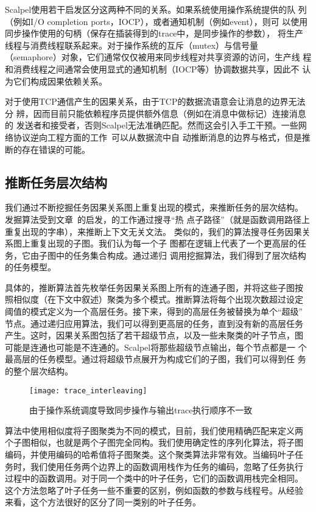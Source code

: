 Scalpel使用若干启发区分这两种不同的关系。如果系统使用操作系统提供的队
列（例如I/O completion ports，IOCP），或者通知机制（例如event），则可
以使用同步操作使用的句柄（保存在插装得到的trace中，是同步操作的参数），
将生产线程与消费线程联系起来。对于操作系统的互斥（mutex）与信号量
（semaphore）对象，它们通常仅仅被用来同步线程对共享资源的访问，生产线
程和消费线程之间通常会使用显式的通知机制（IOCP等）协调数据共享，因此不
认为它们构成因果依赖关系。

对于使用TCP通信产生的因果关系，由于TCP的数据流语意会让消息的边界无法分
辨，因而目前只能依赖程序员提供额外信息（例如在消息中做标记）连接消息的
发送者和接受者，否则Scalpel无法准确匹配。然而这会引入手工干预。一些网
络协议逆向工程方面的工作~\cite{Caballero2007, Cui2007}可以从数据流中自
动推断消息的边界与格式，但是推断的存在错误的可能。

\subsection{推断任务层次结构}

我们通过不断挖掘任务因果关系图上重复出现的模式，来推断任务的层次结构。
发掘算法受到文章~\cite{wpp}的启发，的工作通过搜寻“热
点子路径”（就是函数调用路径上重复出现的字串），来推断上下文无关文法。
类似的，我们的算法搜寻任务因果关系图上重复出现的子图。我们认为每一个子
图都在逻辑上代表了一个更高层的任务，它由子图中的任务集合构成。通过递归
调用挖掘算法，我们得到了层次结构的任务模型。

具体的，推断算法首先枚举任务因果关系图上所有的连通子图，并将这些子图按
照相似度（在下文中叙述）聚类为多个模式。推断算法将每个出现次数超过设定
阈值的模式定义为一个高层任务。接下来，得到的高层任务被替换为单个“超级”
节点。通过递归应用算法，我们可以得到更高层的任务，直到没有新的高层任务
产生。这时，因果关系图包括了若干超级节点，以及一些未聚类的叶子节点，图
可能是连通也可能是不连通的。Scalpel将那些超级节点输出，每个节点都是一
个最高层的任务模型。通过将超级节点展开为构成它们的子图，我们可以得到任
务的整个层次结构。

\begin{figure}
  \centering
  \begin{minipage}{0.8\linewidth}
    \centering
    \texttt{[image: trace\_interleaving]}
    \caption{由于操作系统调度导致同步操作与输出trace执行顺序不一致}
    \label{fig:trace_interleaving}
  \end{minipage}
\end{figure}

算法中使用相似度将子图聚类为不同的模式，目前，我们使用精确匹配来定义两
个子图相似，也就是两个子图完全同构。我们使用确定性的序列化算法，将子图
编码，并使用编码的哈希值将子图聚类。这个聚类算法非常有效。当编码叶子任
务时，我们使用任务两个边界上的函数调用栈作为任务的编码，忽略了任务执行
过程中的函数调用。对于同一个类中的叶子任务，它们的函数调用栈完全相同。
这个方法忽略了叶子任务一些不重要的区别，例如函数的参数与线程号。从经验
来看，这个方法很好的区分了同一类别的叶子任务。

